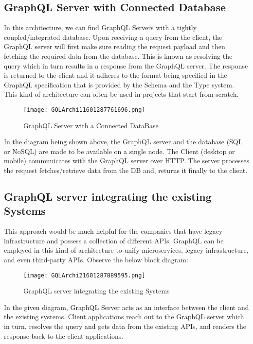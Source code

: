 \documentclass[../main.tex]{subfiles}
\begin{document}
\subsection{GraphQL Server with Connected Database}
In this architecture, we can find GraphQL Servers with a tightly coupled/integrated database.
Upon receiving a query from the client, the GraphQL server will first make sure reading the request payload and then fetching the required data from the database.
This is known as resolving the query which in turn results in a response from the GraphQL server.
The response is returned to the client and it adheres to the format being specified in the GraphQL specification that is provided by the Schema and the Type system.
This kind of architecture can often be used in projects that start from scratch.

\begin{figure}[h!]
\centerline{\texttt{[image: GQLArchi11601287761696.png]}}
\caption{GraphQL Server with a Connected DataBase}
\label{fig:GraphQL-Server-with-a-Connected-DataBase}
\end{figure}

In the diagram being shown above, the GraphQL server and the database (SQL or NoSQL) are made to be available on a single node. The Client (desktop or mobile) communicates with the GraphQL server over HTTP. The server processes the request fetches/retrieve data from the DB and, returns it finally to the client.

\subsection{GraphQL server integrating the existing Systems}
This approach would be much helpful for the companies that have legacy infrastructure and possess a collection of different APIs. GraphQL can be employed in this kind of architecture to unify microservices, legacy infrastructure, and even third-party APIs.
Observe the below block diagram:

\begin{figure}[h!]
\centerline{\texttt{[image: GQLArchi21601287889595.png]}}
\caption{GraphQL server integrating the existing Systems}
\label{fig:GraphQL-server-integrating-the-existing-Systems}
\end{figure}

In the given diagram, GraphQL Server acts as an interface between the client and the existing systems. Client applications reach out to the GraphQL server which in turn, resolves the query and gets data from the existing APIs, and renders the response back to the client applications.
\end{document}
